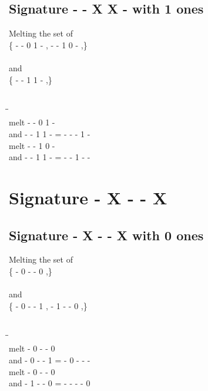 \documentclass{article}
\begin{document}
\subsection{Signature - - X X - with 1 ones}
Melting the set of\\
\{ -  -  0  1  - , -  -  1  0  - ,\}\\\\
and\\
\{ -  -  1  1  - ,\}\\\\
\begin{tabbing}
\hspace{3cm}\=\hspace{3cm}\=\hspace{3cm}\\[1cm]
melt\> -  -  0  1  - \\
and\> -  -  1  1  - \>
 =  -  -  -  1  - \\[1mm]
melt\> -  -  1  0  - \\
and\> -  -  1  1  - \>
 =  -  -  1  -  - \\[1mm]
\end{tabbing}
\newpage
\section{Signature - X - - X }
\subsection{Signature - X - - X with 0 ones}
Melting the set of\\
\{ -  0  -  -  0 ,\}\\\\
and\\
\{ -  0  -  -  1 , -  1  -  -  0 ,\}\\\\
\begin{tabbing}
\hspace{3cm}\=\hspace{3cm}\=\hspace{3cm}\\[1cm]
melt\> -  0  -  -  0 \\
and\> -  0  -  -  1 \>
 =  -  0  -  -  - \\[1mm]
melt\> -  0  -  -  0 \\
and\> -  1  -  -  0 \>
 =  -  -  -  -  0 \\[1mm]
\end{tabbing}
\newpage
\end{document}
